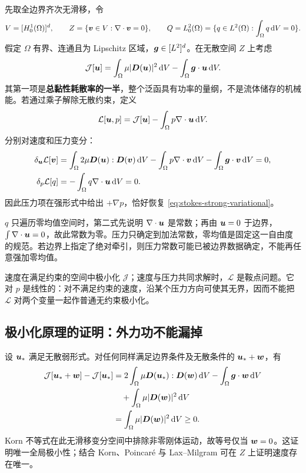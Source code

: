 先取全边界齐次无滑移，令
\begin{equation}
 V=[H^1_0(\Omega)]^d,\qquad
 Z=\{\bm{v}\in V:\nabla\cdot\bm{v}=0\},\qquad
 Q=L^2_0(\Omega)=\{q\in L^2(\Omega):\int_\Omega q\,\mathrm d V=0\}.
\end{equation}
假定 $\Omega$ 有界、连通且为 Lipschitz 区域，$\bm{g}\in[L^2]^d$。在无散空间 $Z$ 上考虑
\begin{equation}
 \mathcal J[\bm{u}]=\int_\Omega\mu|\bm{D}(\bm{u})|^2\,\mathrm d V
 -\int_\Omega\bm{g}\cdot\bm{u}\,\mathrm d V.
 \label{eq:stokes-min-functional}
\end{equation}
其第一项是\textbf{总黏性耗散率的一半}，整个泛函具有功率的量纲，不是流体储存的机械能。若通过乘子解除无散约束，定义
\begin{equation}
 \mathcal L[\bm{u},p]=\mathcal J[\bm{u}]
 -\int_\Omega p\nabla\cdot\bm{u}\,\mathrm d V.
 \label{eq:stokes-lagrangian}
\end{equation}
分别对速度和压力变分：
\begin{align}
 \delta_{\bm{u}}\mathcal L[\bm{v}]
 &=\int_\Omega2\mu\bm{D}(\bm{u}):\bm{D}(\bm{v})\,\mathrm d V
 -\int_\Omega p\nabla\cdot\bm{v}\,\mathrm d V
 -\int_\Omega\bm{g}\cdot\bm{v}\,\mathrm d V=0,\\
 \delta_p\mathcal L[q]&=-\int_\Omega q\nabla\cdot\bm{u}\,\mathrm d V=0.
\end{align}
因此压力项在强形式中给出 $+\nabla p$，恰好恢复 \eqref{eq:stokes-strong-variational}。

$q$ 只遍历零均值空间时，第二式先说明 $\nabla\cdot\bm{u}$ 是常数；再由 $\bm{u}=0$ 于边界，$\int\nabla\cdot\bm{u}=0$，故此常数为零。压力只确定到加法常数，零均值是固定这一自由度的规范。若边界上指定了绝对牵引，则压力常数可能已被边界数据确定，不能再任意强加零均值。

\begin{warningbox}
速度在满足约束的空间中极小化 $\mathcal J$；速度与压力共同求解时，$\mathcal L$ 是鞍点问题。它对 $p$ 是线性的：对不满足约束的速度，沿某个压力方向可使其无界，因而不能把 $\mathcal L$ 对两个变量一起作普通无约束极小化。
\end{warningbox}

\subsection{极小化原理的证明：外力功不能漏掉}

设 $\bm{u}_*$ 满足无散弱形式。对任何同样满足边界条件及无散条件的 $\bm{u}_*+\bm{w}$，有
\begin{align}
 \mathcal J[\bm{u}_*+\bm{w}]-\mathcal J[\bm{u}_*]
 &=2\int_\Omega\mu\bm{D}(\bm{u}_*):\bm{D}(\bm{w})\,\mathrm d V
 -\int_\Omega\bm{g}\cdot\bm{w}\,\mathrm d V\\
 &\quad+\int_\Omega\mu|\bm{D}(\bm{w})|^2\,\mathrm d V\\
 &=\int_\Omega\mu|\bm{D}(\bm{w})|^2\,\mathrm d V\ge0.
 \label{eq:stokes-energy-gap}
\end{align}
Korn 不等式在此无滑移变分空间中排除非零刚体运动，故等号仅当 $\bm{w}=0$。这证明唯一全局极小性；结合 Korn、Poincar\'e 与 Lax--Milgram 可在 $Z$ 上证明速度存在唯一。

